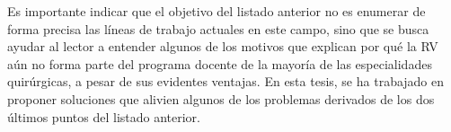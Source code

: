 
Es importante indicar que el objetivo del listado anterior no es enumerar de forma precisa las líneas de trabajo actuales en este campo, sino que se busca ayudar al lector a entender algunos de los motivos que explican por qué la \ac{RV} aún no forma parte del programa docente de la mayoría de las especialidades quirúrgicas, a pesar de sus evidentes ventajas. En esta tesis, se ha trabajado en proponer soluciones que alivien algunos de los problemas derivados de los dos últimos puntos del listado anterior.






